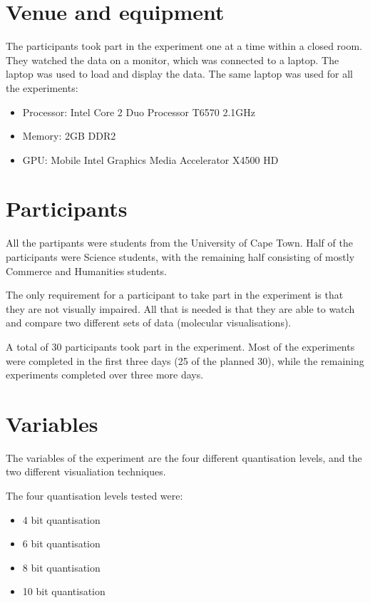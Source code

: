 
\section{Venue and equipment}
\label{sec:experiment_venue}

The participants took part in the experiment one at a time within a closed
room. They watched the data on a monitor, which was connected to a laptop. The
laptop was used to load and display the data. The same laptop was used for all
the experiments:
\begin{itemize}
  \item Processor: Intel Core 2 Duo Processor T6570 2.1GHz
  \item Memory: 2GB DDR2
  \item GPU: Mobile Intel Graphics Media Accelerator X4500 HD
\end{itemize}


\section{Participants}
\label{sec:experiment_participants}

All the partipants were students from the University of Cape Town. Half of the
participants were Science students, with the remaining half consisting of
mostly Commerce and Humanities students.

The only requirement for a participant to take part in the experiment is that
they are not visually impaired. All that is needed is that they are able to
watch and compare two different sets of data (molecular visualisations).

A total of 30 participants took part in the experiment. Most of the experiments
were completed in the first three days (25 of the planned 30), while the
remaining experiments completed over three more days.


\section{Variables}
\label{sec:experiment_variables}

The variables of the experiment are the four different quantisation levels, and
the two different visualiation techniques.

The four quantisation levels tested were:
\begin{itemize}
  \item 4 bit quantisation
  \item 6 bit quantisation
  \item 8 bit quantisation
  \item 10 bit quantisation
\end{itemize}

